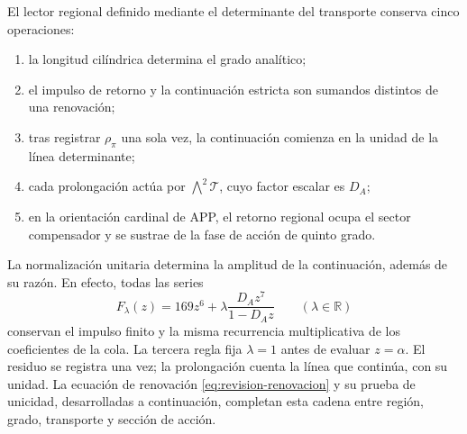 \begin{definition}
\label{def:accion-lector-regional}
El lector regional definido mediante el determinante del transporte conserva cinco operaciones:
\begin{enumerate}
 \item la longitud cilíndrica determina el grado analítico;
 \item el impulso de retorno y la continuación estricta son sumandos
 distintos de una renovación;
 \item tras registrar \(\rho_\pi\) una sola vez, la continuación
 comienza en la unidad de la línea determinante;
 \item cada prolongación actúa por \(\bigwedge^2\mathcal T\), cuyo
 factor escalar es \(D_A\);
 \item en la orientación cardinal de APP, el retorno regional ocupa el
 sector compensador y se sustrae de la fase de acción de quinto grado.
\end{enumerate}
\end{definition}

La normalización unitaria determina la amplitud de la continuación, además
de su razón. En efecto, todas las series
\[
 F_\lambda(z)=169z^6+\lambda\frac{D_Az^7}{1-D_Az}
 \qquad(\lambda\in\mathbb R)
\]
conservan el impulso finito y la misma recurrencia multiplicativa de los
coeficientes de la cola. La tercera regla fija \(\lambda=1\) antes de evaluar
\(z=\alpha\). El residuo se registra una vez; la prolongación cuenta
la línea que continúa, con su unidad. La ecuación de renovación
\eqref{eq:revision-renovacion} y su prueba de unicidad, desarrolladas
a continuación, completan esta cadena entre región, grado,
transporte y sección de acción.
